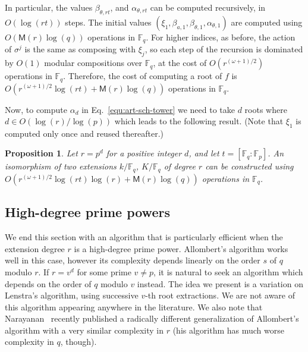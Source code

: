 \documentclass{mcom-l}
\theoremstyle{plain}
\newtheorem{proposition}[theorem]{Proposition}
\theoremstyle{definition}
\newcommand{\F}{\ensuremath{\mathbb{F}}}
\newcommand{\MM}{\ensuremath{\mathsf{M}}}
\newcounter{algorithm}
\begin{document}
In particular, the values $\beta_{\theta,rt}$, and
$\alpha_{\theta,rt}$ can be computed recursively, in $O(\log(rt))$
steps. The initial values $(\xi_1,\beta_{a,1}, \beta_{\theta,1},
\alpha_{\theta,1})$ are computed using $O(\MM(r)\log(q))$ operations
in $\F_q$. For higher indices, as before, the action of $\sigma^j$ is the same as composing
with $\xi_j$, so each step of the recursion is dominated by $O(1)$
modular compositions over $\F_q$, at the cost of $O(r^{(\omega+1)/2})$
operations in $\F_q$.  Therefore, the cost of
computing a root of $f$ is $O(r^{(\omega+1)/2}\log(rt) +
\MM(r)\log(q))$ operations in $\F_q$.

Now, to compute $\alpha_d$ in Eq.~\eqref{equ:art-sch-tower} we 
need to take $d$ roots where $d \in O(\log(r) / \log(p))$ which leads to the following result. (Note that $\xi_1$ is computed only once and reused thereafter.)

\begin{proposition}
	Let $r = p^d$ for a positive integer $d$, and let $t = [\F_q : \F_p]$. An isomorphism of two 
	extensions $k / \F_q$, $K / \F_q$ of degree $r$ can be constructed using 
	$O(r^{(\omega+1)/2}\log(rt)\log(r) + \MM(r)\log(q))$ operations in $\F_q$.
\end{proposition}


\subsection{High-degree prime powers}
\label{sec:fast-algor-large}

We end this section with an algorithm that is particularly efficient when the extension 
degree $r$ is a high-degree prime power.
Allombert's algorithm works well in this case, however its
complexity depends linearly on the order $s$ of $q$ modulo $r$. If $r=v^d$ for some prime $v\ne p$,
it is natural to seek an algorithm which depends on the order of $q$ modulo $v$ instead.
The idea we present is a variation on Lenstra's algorithm, using successive $v$-th root
extractions.
We are not aware of this algorithm appearing anywhere in the literature. %
We also note that Narayanan~\cite[Sec.~5]{narayanan2016fast} recently
published a radically different generalization
of Allombert's algorithm with a very similar complexity in $r$ (his
algorithm has much worse complexity in $q$, though).
\end{document}
